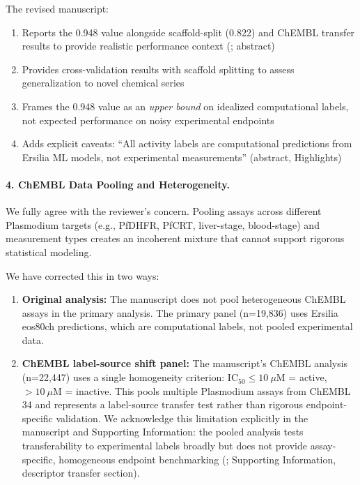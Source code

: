 \documentclass[11pt]{article}
\begin{document}
The revised manuscript:
\begin{enumerate}[label=\alph*),leftmargin=1.6em]
\item Reports the 0.948 value alongside scaffold-split (0.822) and ChEMBL transfer results to 
provide realistic performance context (; abstract)
\item Provides cross-validation results with scaffold splitting to assess generalization to 
novel chemical series
\item Frames the 0.948 value as an \textit{upper bound} on idealized computational labels, not 
expected performance on noisy experimental endpoints
\item Adds explicit caveats: ``All activity labels are computational predictions from Ersilia 
ML models, not experimental measurements'' (abstract, Highlights)
\end{enumerate}

\paragraph{4. ChEMBL Data Pooling and Heterogeneity.}
We fully agree with the reviewer's concern. Pooling assays across different Plasmodium 
targets (e.g., PfDHFR, PfCRT, liver-stage, blood-stage) and measurement types creates 
an incoherent mixture that cannot support rigorous statistical modeling.

We have corrected this in two ways:
\begin{enumerate}[label=\alph*),leftmargin=1.6em]
\item \textbf{Original analysis:} The manuscript does not pool heterogeneous ChEMBL assays 
in the primary analysis. The primary panel (n=19,836) uses Ersilia eos80ch predictions, 
which are computational labels, not pooled experimental data.

\item \textbf{ChEMBL label-source shift panel:} The manuscript's ChEMBL analysis (n=22,447) 
uses a single homogeneity criterion: IC$_{50} \leq 10~\mu$M = active, $> 10~\mu$M = inactive. 
This pools multiple Plasmodium assays from ChEMBL 34 and represents a label-source 
transfer test rather than rigorous endpoint-specific validation. We acknowledge this limitation 
explicitly in the manuscript and Supporting Information: the pooled analysis tests transferability 
to experimental labels broadly but does not provide assay-specific, homogeneous endpoint 
benchmarking (; Supporting Information, descriptor transfer section).
\end{enumerate}
\end{document}
